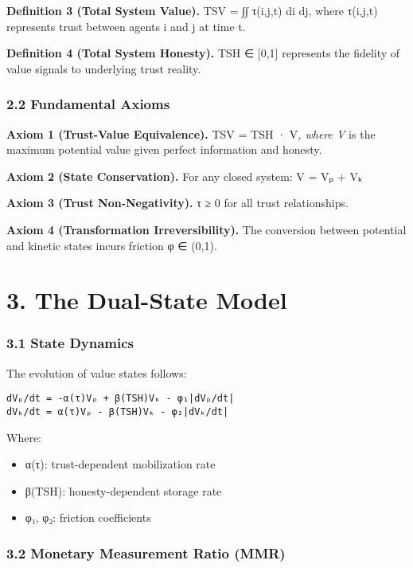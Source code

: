 \documentclass[11pt,oneside]{book}
\begin{document}
\textbf{Definition 3 (Total System Value).} TSV = ∫∫ τ(i,j,t) di dj, where τ(i,j,t) represents trust between agents i and j at time t.

\textbf{Definition 4 (Total System Honesty).} TSH ∈ [0,1] represents the fidelity of value signals to underlying trust reality.

\subsubsection{2.2 Fundamental Axioms}

\textbf{Axiom 1 (Trust-Value Equivalence).} TSV = TSH · V\textit{, where V} is the maximum potential value given perfect information and honesty.

\textbf{Axiom 2 (State Conservation).} For any closed system: V = Vₚ + Vₖ

\textbf{Axiom 3 (Trust Non-Negativity).} τ ≥ 0 for all trust relationships.

\textbf{Axiom 4 (Transformation Irreversibility).} The conversion between potential and kinetic states incurs friction φ ∈ (0,1).

\section{3. The Dual-State Model}

\subsubsection{3.1 State Dynamics}

The evolution of value states follows:

\begin{verbatim}
dVₚ/dt = -α(τ)Vₚ + β(TSH)Vₖ - φ₁|dVₚ/dt|
dVₖ/dt = α(τ)Vₚ - β(TSH)Vₖ - φ₂|dVₖ/dt|
\end{verbatim}

Where:
\begin{itemize}
\item α(τ): trust-dependent mobilization rate
\item β(TSH): honesty-dependent storage rate
\item φ₁, φ₂: friction coefficients
\end{itemize}

\subsubsection{3.2 Monetary Measurement Ratio (MMR)}
\end{document}

